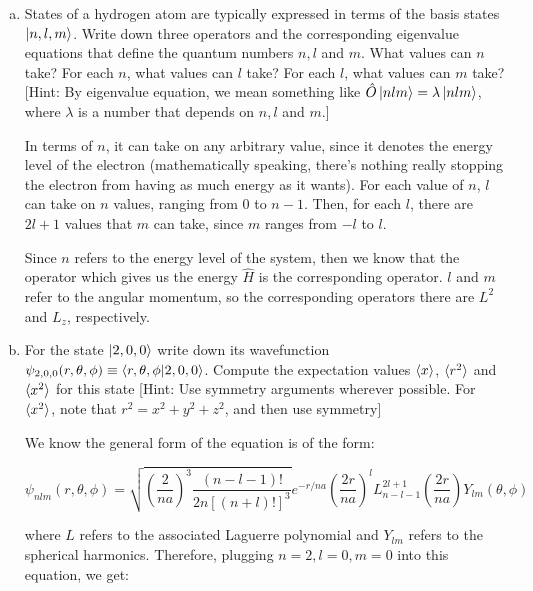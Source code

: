 \documentclass[10pt]{article}
\begin{document}
    \begin{enumerate}[(a)]
        \item States of a hydrogen atom are typically expressed in terms of the basis states $\ket{n, l, m}$. Write down three operators and the corresponding eigenvalue equations that define the quantum numbers $n, l$ and $m$. What values can $n$ take? For each $n$, what values can $l$ take? For each $l$, what values can $m$ take? [Hint: By eigenvalue equation, we mean something like $\hat O\ket{nlm} = \lambda \ket{nlm}$, where $\lambda$ is a number that depends on $n, l$ and $m$.]
        
        \begin{solution}
            In terms of $n$, it can take on any arbitrary value, since it denotes the energy level of the electron (mathematically speaking, there's nothing really stopping the electron from having as much energy as it wants). For each value of $n$, $l$ can take on $n$ values, ranging from $0$ to $n-1$. Then, for each $l$, there are $2l+1$ values that $m$ can take, since $m$ ranges from $-l$ to $l$.

            Since $n$ refers to the energy level of the system, then we know that the operator which gives us the energy $\hat H$ is the corresponding operator. $l$ and $m$ refer to the angular momentum, so the corresponding operators there are $L^2$ and $L_z$, respectively.
        \end{solution}
        \item For the state $\ket{2, 0, 0}$ write down its wavefunction $\psi_{2, 0, 0} (r, \theta, \phi) \equiv \braket{r, \theta, \phi}{2, 0, 0}$. Compute the expectation values $\langle x \rangle$, $\langle r^2 \rangle$ and $\langle x^2 \rangle$ for this state [Hint: Use symmetry arguments wherever possible. For $\langle x^2 \rangle$, note that $r^2 = x^2 + y^2 + z^2$, and then use symmetry]
        
        \begin{solution}
            We know the general form of the equation is of the form: 

            \[ \psi_{nlm}(r, \theta, \phi) = \sqrt{\left(\frac{2}{na}\right)^3 \frac{(n - l - 1)!}{2n[(n+l)!]^3}} e^{-r/na}\left( \frac{2r}{na}\right)^l L^{2l+1}_{n - l - 1}\left(\frac{2r}{na}\right) Y_{lm} (\theta, \phi)\]

            where $L$ refers to the associated Laguerre polynomial and $Y_{lm}$ refers to the spherical harmonics. Therefore, plugging $n = 2, l = 0, m = 0$ into this equation, we get: 


\end{solution}
\end{enumerate}
\end{document}
